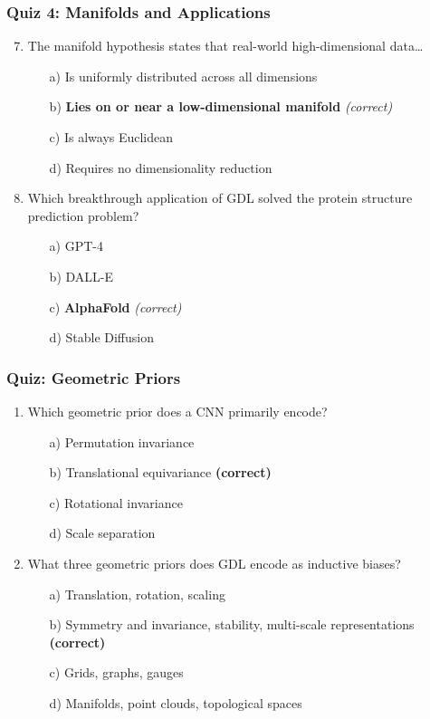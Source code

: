 \begin{frame}[fragile]\frametitle{Quiz 4: Manifolds and Applications}
  \begin{enumerate}
    \setcounter{enumi}{6}
    \item The manifold hypothesis states that real-world high-dimensional data\ldots
      \begin{itemize}
        \item[a)] Is uniformly distributed across all dimensions
        \item[b)] \textbf{Lies on or near a low-dimensional manifold} \textit{(correct)}
        \item[c)] Is always Euclidean
        \item[d)] Requires no dimensionality reduction
      \end{itemize}
    \vspace{0.4cm}
    \item Which breakthrough application of GDL solved the protein structure prediction problem?
      \begin{itemize}
        \item[a)] GPT-4
        \item[b)] DALL-E
        \item[c)] \textbf{AlphaFold} \textit{(correct)}
        \item[d)] Stable Diffusion
      \end{itemize}
  \end{enumerate}
\end{frame}

\begin{frame}[fragile]\frametitle{Quiz: Geometric Priors}
  \begin{enumerate}
    \item Which geometric prior does a CNN primarily encode?
      \begin{itemize}
        \item[a)] Permutation invariance
        \item[b)] Translational equivariance \textbf{(correct)}
        \item[c)] Rotational invariance
        \item[d)] Scale separation
      \end{itemize}
    \vspace{0.4cm}
    \item What three geometric priors does GDL encode as inductive biases?
      \begin{itemize}
        \item[a)] Translation, rotation, scaling
        \item[b)] Symmetry and invariance, stability, multi-scale representations \textbf{(correct)}
        \item[c)] Grids, graphs, gauges
        \item[d)] Manifolds, point clouds, topological spaces
      \end{itemize}
  \end{enumerate}
\end{frame}

